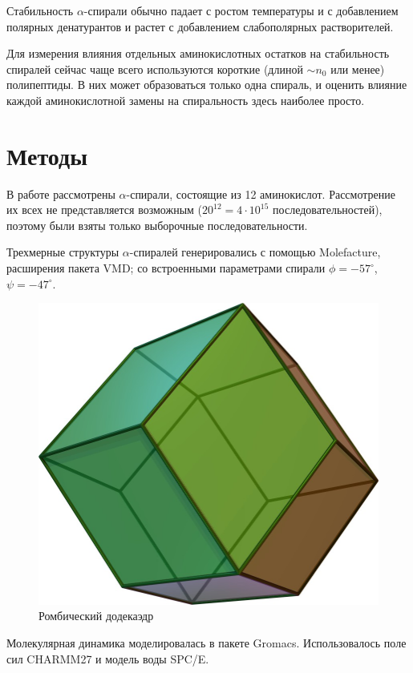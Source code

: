 \documentclass[
11pt,%
tightenlines,%
twoside,%
onecolumn,%
nofloats,%
nobibnotes,%
nofootinbib,%
superscriptaddress,%
noshowpacs,%
centertags]%
{revtex4}
\begin{document}
Стабильность $\alpha$-спирали обычно падает с ростом температуры и с добавлением полярных денатурантов и растет с добавлением слабополярных растворителей.

Для измерения влияния отдельных аминокислотных остатков на стабильность спиралей сейчас чаще всего используются короткие (длиной $\sim n_0$ или менее) полипептиды. В них может образоваться только одна спираль, и оценить влияние каждой аминокислотной замены на спиральность здесь наиболее просто. 


\newpage
\section{Методы}
В работе рассмотрены $\alpha$-спирали, состоящие из 12 аминокислот. 
Рассмотрение их всех не представляется возможным ($20^{12} = 4 \cdot 10^{15}$ последовательностей),
поэтому были взяты только выборочные последовательности. \par
Трехмерные структуры $\alpha$-спиралей генерировались с помощью Molefacture, расширения пакета VMD;
со встроенными параметрами спирали $\phi = -57^{\circ}$, $\psi = -47^{\circ}$. \par
\begin{figure}
	\centering
	\includegraphics[scale=0.2]{Rhombicdodecahedron}
	\caption{Ромбический додекаэдр}
\end{figure}
Молекулярная динамика моделировалась в пакете Gromacs. 
Использовалось поле сил CHARMM27 и модель воды SPC/E. 
\end{document}
